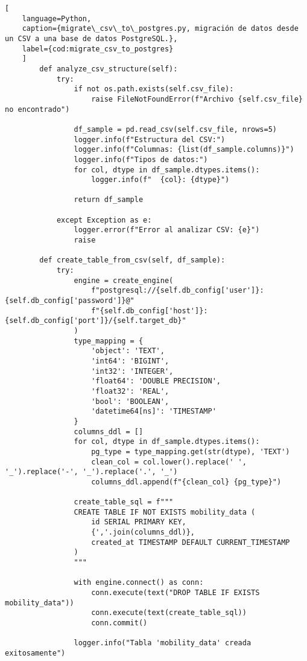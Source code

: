 \begin{lstlisting}[
    language=Python,
    caption={migrate\_csv\_to\_postgres.py, migración de datos desde un CSV a una base de datos PostgreSQL.},
    label={cod:migrate_csv_to_postgres}
    ]
        def analyze_csv_structure(self):
            try:
                if not os.path.exists(self.csv_file):
                    raise FileNotFoundError(f"Archivo {self.csv_file} no encontrado")
                
                df_sample = pd.read_csv(self.csv_file, nrows=5)
                logger.info(f"Estructura del CSV:")
                logger.info(f"Columnas: {list(df_sample.columns)}")
                logger.info(f"Tipos de datos:")
                for col, dtype in df_sample.dtypes.items():
                    logger.info(f"  {col}: {dtype}")
                
                return df_sample
                
            except Exception as e:
                logger.error(f"Error al analizar CSV: {e}")
                raise
        
        def create_table_from_csv(self, df_sample):
            try:
                engine = create_engine(
                    f"postgresql://{self.db_config['user']}:{self.db_config['password']}@"
                    f"{self.db_config['host']}:{self.db_config['port']}/{self.target_db}"
                )
                type_mapping = {
                    'object': 'TEXT',
                    'int64': 'BIGINT',
                    'int32': 'INTEGER',
                    'float64': 'DOUBLE PRECISION',
                    'float32': 'REAL',
                    'bool': 'BOOLEAN',
                    'datetime64[ns]': 'TIMESTAMP'
                }
                columns_ddl = []
                for col, dtype in df_sample.dtypes.items():
                    pg_type = type_mapping.get(str(dtype), 'TEXT')
                    clean_col = col.lower().replace(' ', '_').replace('-', '_').replace('.', '_')
                    columns_ddl.append(f"{clean_col} {pg_type}")
                
                create_table_sql = f"""
                CREATE TABLE IF NOT EXISTS mobility_data (
                    id SERIAL PRIMARY KEY,
                    {','.join(columns_ddl)},
                    created_at TIMESTAMP DEFAULT CURRENT_TIMESTAMP
                )
                """
                
                with engine.connect() as conn:
                    conn.execute(text("DROP TABLE IF EXISTS mobility_data"))
                    conn.execute(text(create_table_sql))
                    conn.commit()
                    
                logger.info("Tabla 'mobility_data' creada exitosamente")
                

\end{lstlisting}
